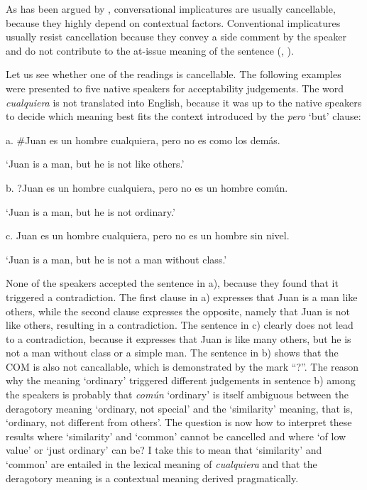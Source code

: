 \documentclass[output=paper]{langscibook}
\begin{document}
  As has been argued by \citet{Grice1989}, conversational implicatures are usually cancellable, because they highly depend on contextual factors. Conventional implicatures usually resist cancellation because they convey a side comment by the speaker and do not contribute to the at-issue meaning of the sentence (\citealt{Potts2005}, \citealt{SimonsEtAl2010}).

  Let us see whether one of the readings is cancellable. The following examples were presented to five native speakers for acceptability judgements. The word \textit{cualquiera} is not translated into English, because it was up to the native speakers to decide which meaning best fits the context introduced by the \textit{pero} ‘but’ clause:

\label{bkm:Ref42976554}  a.  \#Juan es un hombre cualquiera, pero no es como los demás.

    ‘Juan is a man, but he is not like others.’

  b.  ?Juan es un hombre cualquiera, pero no es un hombre común.

    ‘Juan is a man, but he is not ordinary.’

  c.  Juan es un hombre cualquiera, pero no es un hombre sin nivel.

    ‘Juan is a man, but he is not a man without class.’

None of the speakers accepted the sentence in a), because they found that it triggered a contradiction. The first clause in a) expresses that Juan is a man like others, while the second clause expresses the opposite, namely that Juan is not like others, resulting in a contradiction. The sentence in c) clearly does not lead to a contradiction, because it expresses that Juan is like many others, but he is not a man without class or a simple man. The sentence in b) shows that the COM is also not cancallable, which is demonstrated by the mark “?”. The reason why the meaning ‘ordinary’ triggered different judgements in sentence b) among the speakers is probably that \textit{común} ‘ordinary’ is itself ambiguous between the deragotory meaning ‘ordinary, not special’ and the ‘similarity’ meaning, that is, ‘ordinary, not different from others’. The question is now how to interpret these results where ‘similarity’ and ‘common’ cannot be cancelled and where ‘of low value’ or ‘just ordinary’ can be? I take this to mean that ‘similarity’ and ‘common’ are entailed in the lexical meaning of \textit{cualquiera} and that the deragotory meaning is a contextual meaning derived pragmatically.
\end{document}
